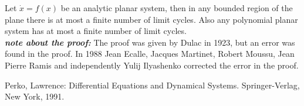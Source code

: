 \documentclass[12pt]{article}
\begin{document}


Let $\dot{x}=f(x)$ be an analytic planar system, then in any bounded region of the plane there is at most a finite number of limit cycles.  Also any polynomial planar system has at most a finite number of limit cycles.\cite{PL}\\

\textbf{\textit{note about the proof:}}
The proof was given by Dulac in 1923, but an error was found in the proof.  In 1988 Jean Ecalle, Jacques Martinet, Robert Moussu, Jean Pierre Ramis and independently Yulij Ilyashenko corrected the error in the proof.\cite{PL} 

\begin{thebibliography}{1}
 Perko, Lawrence:  Differential Equations and Dynamical Systems. Springer-Verlag, New York, 1991.
\end{thebibliography}
\end{document}

